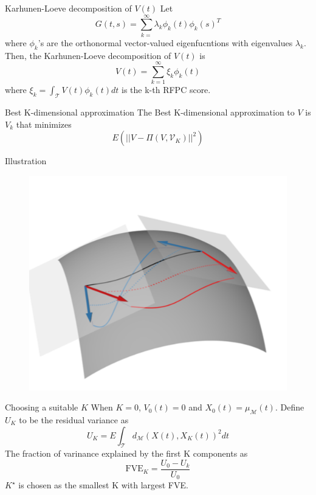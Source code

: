 \documentclass{beamer}
\begin{document}
\begin{frame}{Karhunen-Loeve decomposition of $V(t)$}
Let
\begin{equation*}
G(t,s) = \sum_{k=}^{\infty} \lambda_{k}\phi_{k}(t)\phi_{k}(s)^{T}
\end{equation*}
where $\phi_{k}$'s are the orthonormal vector-valued eigenfucntions with eigenvalues $\lambda_{k}$. Then, the Karhunen-Loeve decomposition of $V(t)$ is
\begin{equation*}
V(t) = \sum_{k=1}^{\infty} \xi_{k}\phi_{k}(t)
\end{equation*}
where $\xi_{k} = \int_{\mathcal{T}}V(t)\phi_{k}(t)dt$ is the k-th RFPC score.
\end{frame}


\begin{frame}{Best K-dimensional approximation}
The Best K-dimensional approximation to $V$ is $V_{k}$ that minimizes
\begin{equation*}
E(||V - \Pi(V,\mathcal{V}_{K})  ||^{2})
\end{equation*}
\end{frame}

\begin{frame}{Illustration}
\begin{figure}
\centering
\includegraphics[scale=1]{karhunen.png}
\end{figure}
\end{frame}


\begin{frame}{Choosing a suitable $K$}
When $K = 0$, $V_{0}(t) = 0$ and $X_{0}(t) = \mu_{\mathcal{M}}(t)$. Define $U_{K}$ to be the residual variance as
\begin{equation*}
U_{K} = E\int_{\mathcal{T}}d_{\mathcal{M}}(X(t),X_{K}(t))^2dt
\end{equation*}
The fraction of varinance explained by the first K components as
\begin{equation*}
\text{FVE}_{K} = \frac{U_{0} - U_{k}}{U_{0}}
\end{equation*}
$K^{\star}$ is chosen as the smallest K with largest FVE.
\end{frame}
\end{document}
